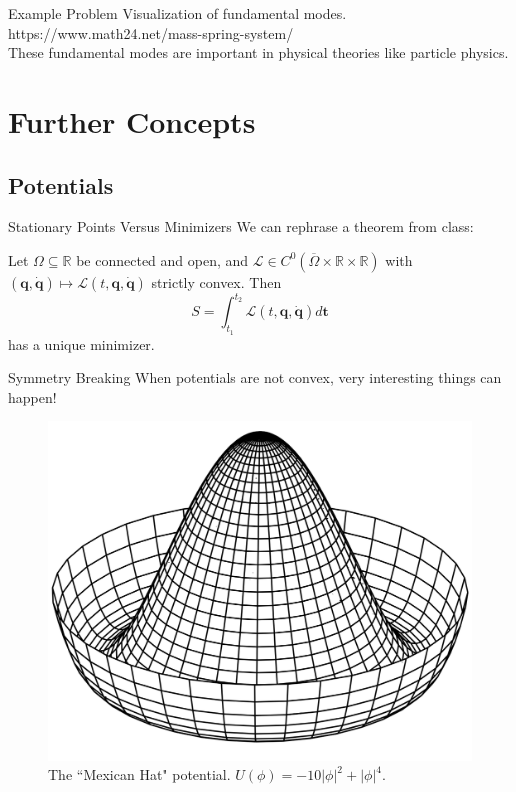 \documentclass[usenames,dvipsnames]{beamer}
\theoremstyle{definition}
\theoremstyle{theorem}
\newcommand{\R}{\mathbb{R}}
\begin{document}
        \begin{frame}{Example Problem}
            Visualization of fundamental modes.
            https://www.math24.net/mass-spring-system/\\
            
            \vspace{.5cm}
            These fundamental modes are important in physical theories like particle physics.
        \end{frame}
        
\section{Further Concepts}

        
    \subsection{Potentials}
        
        \begin{frame}{Stationary Points Versus Minimizers}
            We can rephrase a theorem from class:
            \begin{theorem}
            Let $\Omega \subseteq \R$ be connected and open, and $\mathcal{L}\in C^0(\overline{\Omega}\times \R \times \R)$ with $(\mathbf{q},\dot{\mathbf{q}})\mapsto \mathcal{L}(t,\mathbf{q},\dot{\mathbf{q}})$ strictly convex. Then 
            \[
            S=\int_{t_1}^{t_2} \mathcal{L}(t,\mathbf{q},\dot{\mathbf{q}})d\mathbf{t}
            \]
            has a unique minimizer.
            \end{theorem}
        \end{frame}
        
        \begin{frame}{Symmetry Breaking}
            When potentials are not convex, very interesting things can happen!
            \begin{figure}
                \centering
                \includegraphics[width=.5\textwidth]{Lagrangian_Mechanics/mexican_hat.png}
                \caption{The ``Mexican Hat" potential. $U(\phi)=-10|\phi|^2+|\phi|^4.$}
                \label{fig:my_label}
            \end{figure}
        \end{frame}
        
\end{document}
